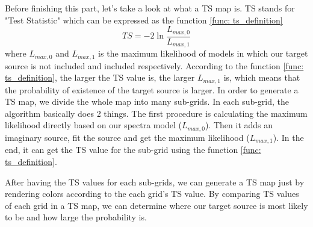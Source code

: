 \documentclass[12pt]{report}
\begin{document}
          Before finishing this part, let's take a look at what a TS map is. TS stands for 
          "Test Statistic" which can be expressed as the function \ref{func: ts_definition}
          \begin{equation}
            TS = -2 \ln{\frac{L_{max,0}}{L_{max,1}}}
            \label{func: ts_definition}
          \end{equation}
          where $L_{max,0}$ and $L_{max,1}$ is the maximum likelihood of models in which our 
          target source is not included and included respectively. According to the function 
          \ref{func: ts_definition}, the larger the TS value is, the larger $L_{max, 1}$ is, which
          means that the probability of existence of the target source is larger. 
          In order to generate a TS map, we divide the whole map into many sub-grids. In each sub-grid,
          the algorithm basically does 2 things. The first procedure is calculating the maximum likelihood 
          directly based on our spectra model ($L_{max,0}$). Then it adds an imaginary source, fit the source 
          and get the maximum likelihood ($L_{max, 1}$). In the end, it can get the TS value for the 
          sub-grid using the function \ref{func: ts_definition}. 

          After having the TS values for each sub-grids, we can generate a TS map just by 
          rendering colors according to the each grid's TS value. By comparing TS values of 
          each grid in a TS map, we can 
          determine where our target source is most likely to be and how large the probability is. 
      
\end{document}
